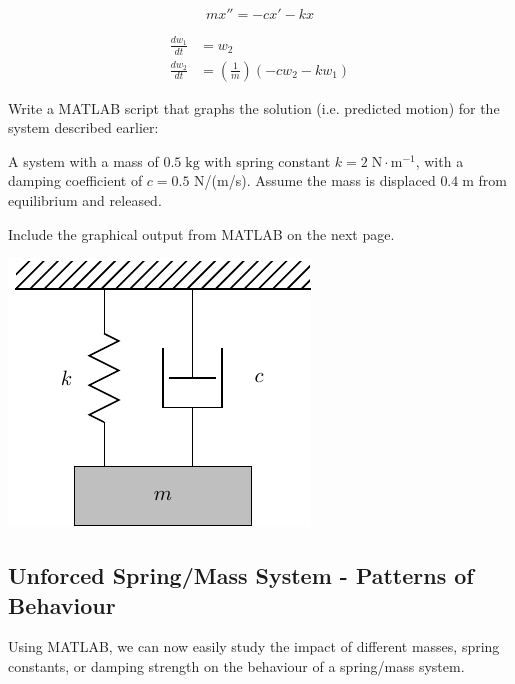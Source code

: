 \begin{minipage}[t]{0.4\linewidth}
\vspace{0pt}
$$ m x'' = -c x' -kx $$
\end{minipage}
\begin{minipage}[t]{0.6\linewidth}
\vspace{0pt}
\begin{align*}
  \frac{dw_1}{dt} & = w_2 \\
  \frac{dw_2}{dt} & = \left(\frac{1}{m}\right) (-c w_2 - k w_1)
\end{align*}
\end{minipage}



\newpage 
\problem Write a MATLAB script that graphs the solution
(i.e. predicted motion) for the system described earlier:

A system with a mass of $0.5 \; \text{kg}$ with spring constant
$k = 2 \; \text{N} \cdot \text{m}^{-1}$, with a damping coefficient of
$c = 0.5$ N/(m/s).  Assume the mass is displaced $0.4 \; \text{m}$
from equilibrium and released.

Include the graphical output from MATLAB on the next page.

\newpage
\hfill
\includegraphics[width=0.3\linewidth]{graphics/notes_08_hanging_mass}


\newpage
{}
\subsection*{Unforced Spring/Mass System - Patterns of Behaviour}

Using MATLAB, we can now easily study the impact of different masses,
spring constants, or damping strength on the behaviour of a
spring/mass system.

